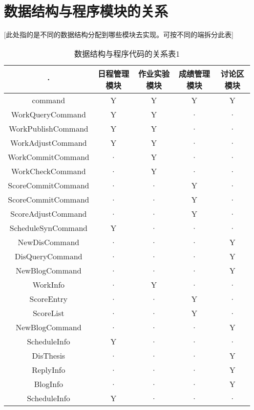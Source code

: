 \section{数据结构与程序模块的关系}
[此处指的是不同的数据结构分配到哪些模块去实现。可按不同的端拆分此表]
\begin{table}[htbp]
\centering
\caption{数据结构与程序代码的关系表1} \label{tab:datastructure-module}
\begin{tabular}{|c|c|c|c|c|}
    \hline
    · & 日程管理模块 & 作业实验模块 & 成绩管理模块 & 讨论区模块 \\
    \hline
    command & Y & Y & Y & Y \\
    \hline
    WorkQueryCommand & Y & Y & · & ·  \\
    \hline
    WorkPublishCommand & Y & Y & · & · \\
    \hline
    WorkAdjustCommand & Y & Y & · & · \\
    \hline
    WorkCommitCommand & · & Y & · & · \\
    \hline
    WorkCheckCommand & · & Y & · & · \\
    \hline
    ScoreCommitCommand & · & · & Y & · \\
    \hline
    ScoreCommitCommand & · & · & Y & · \\
    \hline
    ScoreAdjustCommand & · & · & Y & · \\
    \hline
    ScheduleSynCommand & Y & · & · & · \\
    \hline
    NewDisCommand & · & · & · & Y \\
    \hline
    DisQueryCommand & · & · & · & Y \\
    \hline
    NewBlogCommand & · & · & · & Y \\
    \hline
    WorkInfo & · & Y & · & · \\
    \hline
    ScoreEntry & · & · & Y & · \\
    \hline
    ScoreList & · & · & Y & · \\
    \hline
    NewBlogCommand & · & · & · & Y \\
    \hline
    ScheduleInfo & Y & · & · & · \\
    \hline
    DisThesis & · & · & · & Y \\
    \hline
    ReplyInfo & · & · & · & Y \\
    \hline
    BlogInfo & · & · & · & Y \\
    \hline
    ScheduleInfo & Y & · & · & · \\
    \hline
\end{tabular}
\end{table}

